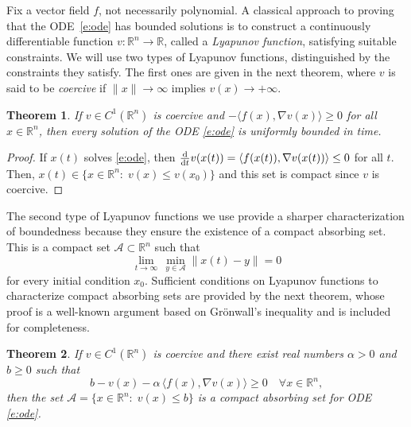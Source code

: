 \documentclass[11pt]{amsart}
\numberwithin{equation}{section}
\theoremstyle{plain}
\newtheorem{theorem}{Theorem}[section]
\theoremstyle{definition}
\theoremstyle{remark}
\newcommand{\R}{\mathbb{R}}
\renewcommand{\vec}[1]{{#1}}
\newcommand{\ip}[2]{\langle #1, #2 \rangle}
\newcommand{\ddt}{\frac{\rm d}{{\rm d} t}}
\begin{document}
Fix a vector field $f$, not necessarily polynomial. A classical approach to proving that the ODE~\cref{e:ode} has bounded solutions is to construct a continuously differentiable function $v:\R^n \to \R$, called a \emph{Lyapunov function}, satisfying suitable constraints. We will use two types of Lyapunov functions, distinguished by the constraints they satisfy. The first ones are given in the next theorem, where $v$ is said to be \emph{coercive} if $\|\vec{x}\|\to \infty$ implies $v(\vec{x})\to +\infty$.
\begin{theorem}\label{th:lyap-fun-0}
    If $v \in C^1(\R^n)$ is coercive and $-\ip{\vec{f}(\vec{x})}{\nabla v(\vec{x})} \geq 0$ for all $\vec{x}\in\R^n$, then every solution of the ODE  \cref{e:ode} is uniformly bounded in time.
\end{theorem}
\begin{proof}
    If $\vec{x}(t)$ solves \cref{e:ode}, then $\ddt v(\vec{x}(t)) = \ip{\vec{f}(\vec{x}(t))}{\nabla v(\vec{x}(t))} \leq 0$ for all $t$. Then, $\vec{x}(t) \in \{ \vec{x}\in\R^n:\; v(\vec{x})\leq v(\vec{x}_0)\}$ and this set is compact since $v$ is coercive.
\end{proof}
The second type of Lyapunov functions we use provide a sharper characterization of boundedness because they ensure the existence of a compact absorbing set. This is a compact set $\mathcal{A} \subset \R^n$ such that
\begin{equation}\label{e:absorbing-set}
    \lim_{t \to \infty} \, \min_{\vec{y} \in \mathcal{A}} \|\vec{x}(t) - y\|= 0
\end{equation}
for every initial condition $\vec{x}_0$. Sufficient conditions on Lyapunov functions to characterize compact absorbing sets are provided by the next theorem, whose proof is a well-known argument based on Gr\"onwall's inequality and is included for completeness.
\begin{theorem}\label{th:lyap-fun}
If $v \in C^1(\R^n)$ is coercive and there exist real numbers $\alpha>0$ and $b \geq 0$ such that
\begin{equation}\label{e:lyapunov-inequality}
    b - v(\vec{x}) - \alpha\,  \ip{\vec{f}(\vec{x})}{\nabla v(\vec{x})}  \geq 0 \quad \forall \vec{x} \in \R^n,
\end{equation}
then the set $\mathcal{A}=\{\vec{x}\in\R^n:\;v(\vec{x})\leq b\}$ is a compact absorbing set for ODE \cref{e:ode}.
\end{theorem}
\end{document}
